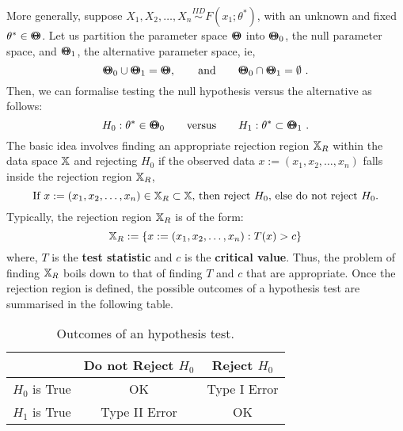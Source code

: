 More generally, suppose $X_1,X_2,\ldots,X_n \overset{IID}{\sim} F(x_1;\theta^*)$, with an unknown and fixed $\theta^* \in {\Theta}\mspace{-11 mu}{\Theta}$.  Let us partition the parameter space ${\Theta}\mspace{-11 mu}{\Theta}$ into ${\Theta}\mspace{-11 mu}{\Theta}_0$, the null parameter space, and ${\Theta}\mspace{-11 mu}{\Theta}_1$, the alternative parameter space, ie,
$$\BB{\Theta}_0 \cup \BB{\Theta}_1 = \BB{\Theta}, \qquad \text{and} \qquad \BB{\Theta}_0 \cap \BB{\Theta}_1 = \emptyset \ .$$
Then, we can formalise testing the null hypothesis versus the alternative as follows:
\[
H_0 : \theta^* \in {\Theta}\mspace{-11 mu}{\Theta}_0 \qquad \text{versus} \qquad H_1 :  \theta^* \subset {\Theta}\mspace{-11 mu}{\Theta}_1 \ .
\]
The basic idea involves finding an appropriate rejection region $\mathbb{X}_R$ within the data space $\mathbb{X}$ and rejecting $H_0$ if the observed data $x:=(x_1,x_2,\ldots,x_n)$ falls inside the rejection region $\mathbb{X}_R$,
\[
\text{If $x:=(x_1,x_2,\ldots,x_n) \in \mathbb{X}_R \subset \mathbb{X}$, then reject $H_0$, else do not reject $H_0$.} 
\]
Typically, the rejection region $\mathbb{X}_R$ is of the form:
\[
\mathbb{X}_R := \{ x:=(x_1,x_2,\ldots,x_n)  : T(x) > c \}
\]
where, $T$ is the {\bf test statistic} and $c$ is the {\bf critical value}.  Thus, the problem of finding $\mathbb{X}_R$ boils down to that of finding $T$ and $c$ that are appropriate.  Once the rejection region is defined, the possible outcomes of a hypothesis test are summarised in the following table.
\begin{table}[htbp]
\begin{center}
\caption{Outcomes of an hypothesis test.}
\begin{tabular}{c|c|c}\hline
& Do not Reject $H_0$ & Reject $H_0$ \\ \hline
$H_0$ is True & OK & Type I Error \\ \hline
$H_1$ is True & Type II Error & OK \\ \hline
\end{tabular}
\end{center}
\end{table}


